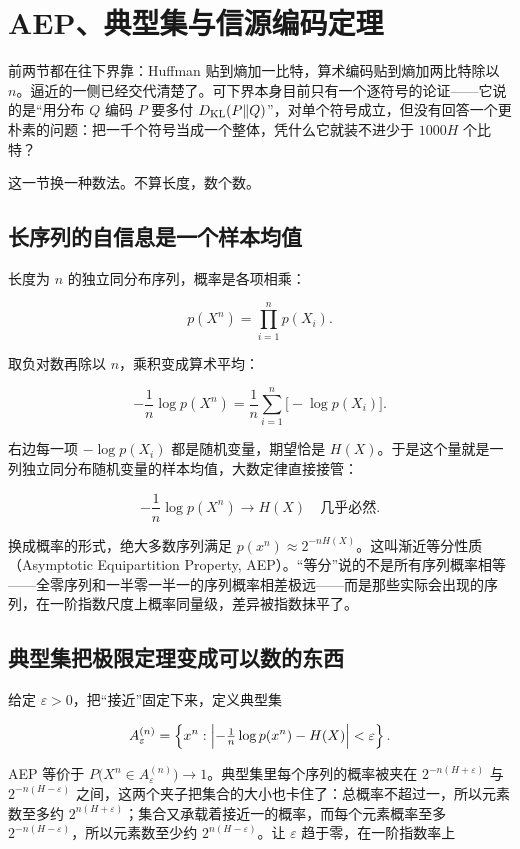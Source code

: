 \section{AEP、典型集与信源编码定理}
\label{sec:07-Information-Theory/04-Source-Coding/04}

前两节都在往下界靠：Huffman 贴到熵加一比特，算术编码贴到熵加两比特除以 \(n\)。逼近的一侧已经交代清楚了。可下界本身目前只有一个逐符号的论证——它说的是``用分布 \(Q\) 编码 \(P\) 要多付 \(D_{\mathrm{KL}}(P\|Q)\)''，对单个符号成立，但没有回答一个更朴素的问题：把一千个符号当成一个整体，凭什么它就装不进少于 \(1000H\) 个比特？

这一节换一种数法。不算长度，数个数。

\subsection{长序列的自信息是一个样本均值}

长度为 \(n\) 的独立同分布序列，概率是各项相乘：

\[
p(X^n)=\prod_{i=1}^{n}p(X_i).
\]

取负对数再除以 \(n\)，乘积变成算术平均：

\[
-\frac1n\log p(X^n)=\frac1n\sum_{i=1}^{n}\bigl[-\log p(X_i)\bigr].
\]

右边每一项 \(-\log p(X_i)\) 都是随机变量，期望恰是 \(H(X)\)。于是这个量就是一列独立同分布随机变量的样本均值，大数定律直接接管：

\[
-\frac1n\log p(X^n)\longrightarrow H(X)\quad\text{几乎必然}.
\]

换成概率的形式，绝大多数序列满足 \(p(x^n)\approx 2^{-nH(X)}\)。这叫渐近等分性质（Asymptotic Equipartition Property, AEP）。``等分''说的不是所有序列概率相等——全零序列和一半零一半一的序列概率相差极远——而是那些实际会出现的序列，在一阶指数尺度上概率同量级，差异被指数抹平了。

\subsection{典型集把极限定理变成可以数的东西}

给定 \(\varepsilon>0\)，把``接近''固定下来，定义典型集

\[
A_\varepsilon^{(n)}=\left\{x^n:\Bigl|-\tfrac1n\log p(x^n)-H(X)\Bigr|<\varepsilon\right\}.
\]

AEP 等价于 \(P\bigl(X^n\in A_\varepsilon^{(n)}\bigr)\to1\)。典型集里每个序列的概率被夹在 \(2^{-n(H+\varepsilon)}\) 与 \(2^{-n(H-\varepsilon)}\) 之间，这两个夹子把集合的大小也卡住了：总概率不超过一，所以元素数至多约 \(2^{n(H+\varepsilon)}\)；集合又承载着接近一的概率，而每个元素概率至多 \(2^{-n(H-\varepsilon)}\)，所以元素数至少约 \(2^{n(H-\varepsilon)}\)。让 \(\varepsilon\) 趋于零，在一阶指数率上

